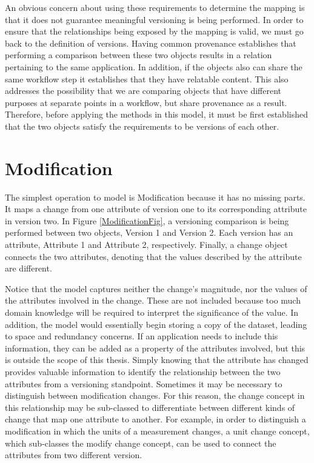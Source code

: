 An obvious concern about using these requirements to determine the mapping is that it does not guarantee meaningful versioning is being performed.
In order to ensure that the relationships being exposed by the mapping is valid, we must go back to the definition of versions.
Having common provenance establishes that performing a comparison between these two objects results in a relation pertaining to the same application.
In addition, if the objects also can share the same workflow step it establishes that they have relatable content.
This also addresses the possibility that we are comparing objects that have different purposes at separate points in a workflow, but share provenance as a result.
Therefore, before applying the methods in this model, it must be first established that the two objects satisfy the requirements to be versions of each other.

\section{Modification}

The simplest operation to model is Modification because it has no missing parts.
It maps a change from one attribute of version one to its corresponding attribute in version two.
In Figure \ref{ModificationFig}, a versioning comparison is being performed between two objects, Version 1 and Version 2.
Each version has an attribute, Attribute 1 and Attribute 2, respectively.
Finally, a change object connects the two attributes, denoting that the values described by the attribute are different.

Notice that the model captures neither the change's magnitude, nor the values of the attributes involved in the change.
These are not included because too much domain knowledge will be required to interpret the significance of the value.
In addition, the model would essentially begin storing a copy of the dataset, leading to space and redundancy concerns.
If an application needs to include this information, they can be added as a property of the attributes involved, but this is outside the scope of this thesis.
Simply knowing that the attribute has changed provides valuable information to identify the relationship between the two attributes from a versioning standpoint.
Sometimes it may be necessary to distinguish between modification changes.
For this reason, the change concept in this relationship may be sub-classed to differentiate between different kinds of change that map one attribute to another.
For example, in order to distinguish a modification in which the units of a measurement changes, a unit change concept, which sub-classes the modify change concept, can be used to connect the attributes from two different version.

